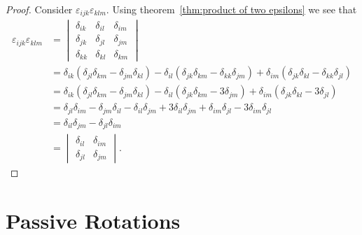 \begin{proof}
    Consider \(\varepsilon_{ijk}\varepsilon_{klm}\).
    Using theorem~\ref{thm:product of two epsilons} we see that
    \begin{align*}
        \varepsilon_{ijk}\varepsilon_{klm} &= 
        \begin{vmatrix}
            \delta_{ik} & \delta_{il} & \delta_{im}\\
            \delta_{jk} & \delta_{jl} & \delta_{jm}\\
            \delta_{kk} & \delta_{kl} & \delta_{km}
        \end{vmatrix}
        \\
        &= \delta_{ik}(\delta_{jl}\delta_{km} - \delta_{jm}\delta_{kl})  - \delta_{il}(\delta_{jk}\delta_{km} - \delta_{kk}\delta_{jm}) + \delta_{im}(\delta_{jk}\delta_{kl} - \delta_{kk}\delta_{jl})\\
        &= \delta_{ik}(\delta_{jl}\delta_{km} - \delta_{jm}\delta_{kl})  - \delta_{il}(\delta_{jk}\delta_{km} - 3\delta_{jm}) + \delta_{im}(\delta_{jk}\delta_{kl} - 3\delta_{jl})\\
        &= \delta_{jl}\delta_{im} - \delta_{jm}\delta_{il} - \delta_{il}\delta_{jm} + 3\delta_{il}\delta_{jm} + \delta_{im}\delta_{jl} - 3\delta_{im}\delta_{jl}\\
        &= \delta_{il}\delta_{jm} - \delta_{jl}\delta_{im}\\
        &= 
        \begin{vmatrix}
            \delta_{il} & \delta_{im}\\
            \delta_{jl} & \delta_{jm}
        \end{vmatrix}
        .
    \end{align*}
\end{proof}

\section{Passive Rotations}
